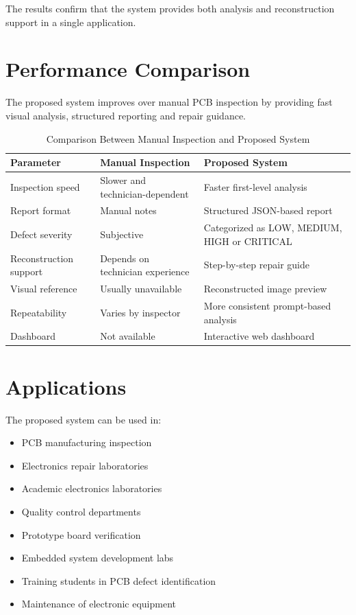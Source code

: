 \documentclass[12pt,a4paper]{report}
\begin{document}
The results confirm that the system provides both analysis and reconstruction support in a single application.

\chapter{Performance Comparison}

The proposed system improves over manual PCB inspection by providing fast visual analysis, structured reporting and repair guidance.

\begin{table}[H]
    \centering
    \begin{tabular}{p{4cm} p{5cm} p{5cm}}
        \toprule
        \textbf{Parameter} & \textbf{Manual Inspection} & \textbf{Proposed System}\\
        \midrule
        Inspection speed & Slower and technician-dependent & Faster first-level analysis\\
        Report format & Manual notes & Structured JSON-based report\\
        Defect severity & Subjective & Categorized as LOW, MEDIUM, HIGH or CRITICAL\\
        Reconstruction support & Depends on technician experience & Step-by-step repair guide\\
        Visual reference & Usually unavailable & Reconstructed image preview\\
        Repeatability & Varies by inspector & More consistent prompt-based analysis\\
        Dashboard & Not available & Interactive web dashboard\\
        \bottomrule
    \end{tabular}
    \caption{Comparison Between Manual Inspection and Proposed System}
\end{table}

\chapter{Applications}

The proposed system can be used in:

\begin{itemize}
    \item PCB manufacturing inspection
    \item Electronics repair laboratories
    \item Academic electronics laboratories
    \item Quality control departments
    \item Prototype board verification
    \item Embedded system development labs
    \item Training students in PCB defect identification
    \item Maintenance of electronic equipment
\end{itemize}
\end{document}
